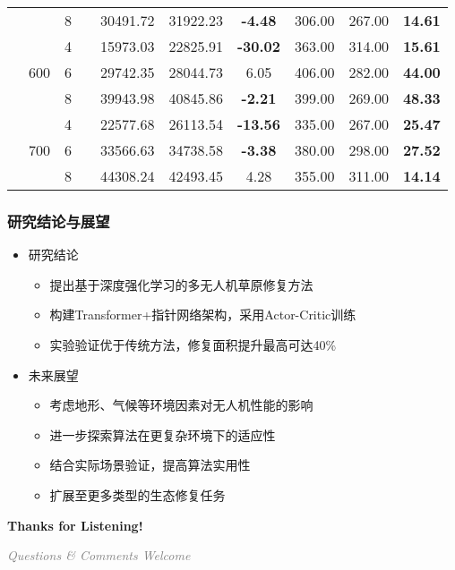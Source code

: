 \documentclass[9pt, aspectratio=169]{beamer}  %
\begin{document}
\begin{frame}
\begin{table}
\begin{tabular}{ccc c ccc ccc}
			 &                        & \multirow{1}{*}{8} &  & 30491.72 & 31922.23 & \textbf{-4.48}  & 306.00 & 267.00 & \textbf{14.61} \\
			\cmidrule(lr){2-10}
			 & \multirow{3}{*}{600} 
			   & \multirow{1}{*}{4} &  & 15973.03 & 22825.91 & \textbf{-30.02} & 363.00 & 314.00 & \textbf{15.61} \\
			 &                        & \multirow{1}{*}{6} &  & 29742.35 & 28044.73 & 6.05           & 406.00 & 282.00 & \textbf{44.00} \\
			 &                        & \multirow{1}{*}{8} &  & 39943.98 & 40845.86 & \textbf{-2.21} & 399.00 & 269.00 & \textbf{48.33} \\
			\cmidrule(lr){2-10}
			 & \multirow{3}{*}{700} 
			   & \multirow{1}{*}{4} &  & 22577.68 & 26113.54 & \textbf{-13.56} & 335.00 & 267.00 & \textbf{25.47} \\
			 &                        & \multirow{1}{*}{6} &  & 33566.63 & 34738.58 & \textbf{-3.38} & 380.00 & 298.00 & \textbf{27.52} \\
			 &                        & \multirow{1}{*}{8} &  & 44308.24 & 42493.45 & 4.28           & 355.00 & 311.00 & \textbf{14.14} \\
			\bottomrule
		\end{tabular}
		\label{tab:combined_comparison}
	\end{table}
\end{frame}

\begin{frame}
	\frametitle{研究结论与展望}
	\begin{itemize}
		\item 研究结论
		      \begin{itemize}
			      \item 提出基于深度强化学习的多无人机草原修复方法
			      \item 构建Transformer+指针网络架构，采用Actor-Critic训练
			      \item 实验验证优于传统方法，修复面积提升最高可达40\%
		      \end{itemize}
		      \vspace{0.5em}
		\item 未来展望
		      \begin{itemize}
			      \item 考虑地形、气候等环境因素对无人机性能的影响
			      \item 进一步探索算法在更复杂环境下的适应性
			      \item 结合实际场景验证，提高算法实用性
			      \item 扩展至更多类型的生态修复任务
		      \end{itemize}
	\end{itemize}
\end{frame}

\begin{frame}
	\begin{center}
		\vspace{2cm}
		{\Huge \sffamily\bfseries\textcolor{blue!60!black}{Thanks for Listening!}}
		\vspace{0.5cm}

		{\large \itshape\textcolor{gray}{Questions \& Comments Welcome}}
	\end{center}
\end{frame}
\end{document}
